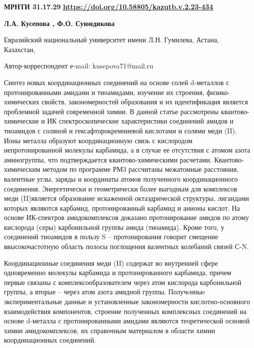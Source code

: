 \newpage
{\bfseries МРНТИ 31.17.29}
\hfill {\bfseries \href{https://doi.org/10.58805/kazutb.v.2.23-434}{https://doi.org/10.58805/kazutb.v.2.23-434}}


\begin{center}
{\bfseries Л.А. Кусепова , Ф.О. Суюндикова}

Евразийский национальный университет имени Л.Н. Гумилева, Астана,
Казахстан,

Автор-корреспондент е-mail: kusepova71@mail.ru
\end{center}

Синтез новых координационных соединений на основе солей d-металлов с
протонированными амидами и тиоамидами, изучение их строения,
физико-химических свойств, закономерностей образования и их
идентификация является проблемной задачей современной химии. В данной
статье рассмотрены квантово-химические и ИК спектроскопические
характеристики соединений амидов и тиоамидов с соляной и
гексафторокремниевой кислотами и солями меди (II). Ионы металла образуют
координационную связь с кислородом непротонированной молекулы карбамида,
а в случае ее отсутствия с атомом азота аминогруппы, что подтверждается
квантово-химическими расчетами. Квантово-химическим методом по программе
РМ3 рассчитаны межатомные расстояния, валентные углы, заряды и
координаты атомов полученного координационного соединения. Энергетически
и геометрически более выгодным для комплексов меди (II)является
образование искаженной октаэдрической структуры, лигандами которых
являются карбамид, протонированный карбамид и анионы кислот. На основе
ИК-спектров амидокомплексов доказано протонирование амидов по атому
кислорода (серы) карбонильной группы амида (тиоамида). Кроме того, у
соединений тиоамидов в пользу S -- протонирования говорит смещение
ввысокочастотную область полосы поглощения валентных колебаний связей
С-N.

Координационные соединения меди (II) содержат во внутренней сфере
одновременно молекулы карбамида и протонированного карбамида, причем
первые связаны с комплексообразователем через атом кислорода
карбонильной группы, а вторые -- через атом азота амидной группы.
Получeнныe экспериментальные данные и установленные закономерности
кислотно-основного взаимодействия компонентов, строение полученных
комплексных соединений на основе d-металла с протонированными амидами
являются теоретической основой химии амидокомплексов, их справочным
материалом в области химии координационных соединений.

